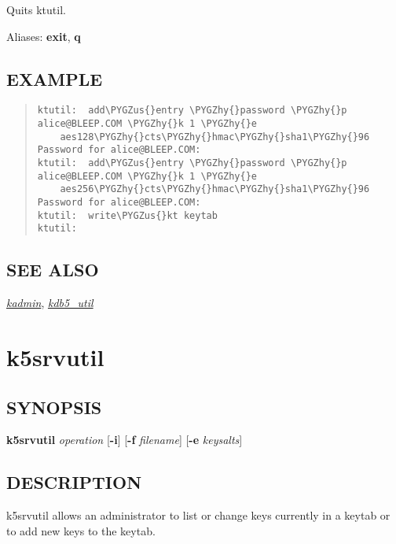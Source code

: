 \documentclass[letterpaper,10pt,english]{sphinxmanual}
\def\PYGZus{\char`\_}
\def\PYGZhy{\char`\-}
\begin{document}
Quits ktutil.

Aliases: \textbf{exit}, \textbf{q}


\subsection{EXAMPLE}
\label{admin/admin_commands/ktutil:example}\begin{quote}

\begin{Verbatim}[commandchars=\\\{\}]
ktutil:  add\PYGZus{}entry \PYGZhy{}password \PYGZhy{}p alice@BLEEP.COM \PYGZhy{}k 1 \PYGZhy{}e
    aes128\PYGZhy{}cts\PYGZhy{}hmac\PYGZhy{}sha1\PYGZhy{}96
Password for alice@BLEEP.COM:
ktutil:  add\PYGZus{}entry \PYGZhy{}password \PYGZhy{}p alice@BLEEP.COM \PYGZhy{}k 1 \PYGZhy{}e
    aes256\PYGZhy{}cts\PYGZhy{}hmac\PYGZhy{}sha1\PYGZhy{}96
Password for alice@BLEEP.COM:
ktutil:  write\PYGZus{}kt keytab
ktutil:
\end{Verbatim}
\end{quote}


\subsection{SEE ALSO}
\label{admin/admin_commands/ktutil:see-also}
{\hyperref[admin/admin_commands/kadmin_local:kadmin-1]{\emph{kadmin}}}, {\hyperref[admin/admin_commands/kdb5_util:kdb5-util-8]{\emph{kdb5\_util}}}


\section{k5srvutil}
\label{admin/admin_commands/k5srvutil:k5srvutil-1}\label{admin/admin_commands/k5srvutil::doc}\label{admin/admin_commands/k5srvutil:k5srvutil}

\subsection{SYNOPSIS}
\label{admin/admin_commands/k5srvutil:synopsis}
\textbf{k5srvutil} \emph{operation}
{[}\textbf{-i}{]}
{[}\textbf{-f} \emph{filename}{]}
{[}\textbf{-e} \emph{keysalts}{]}


\subsection{DESCRIPTION}
\label{admin/admin_commands/k5srvutil:description}
k5srvutil allows an administrator to list or change keys currently in
a keytab or to add new keys to the keytab.
\end{document}
